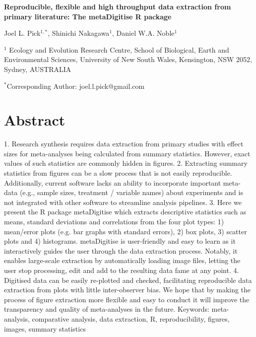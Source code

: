 \documentclass[12pt]{article}
\newcommand{\pkg}[1]{{\fontseries{b}\selectfont #1}}
\let\proglang=\textsf
\begin{document}
\newenvironment{CodeChunk}{}{}

\raggedright


\textbf{Reproducible, flexible and high throughput data extraction from primary literature: The \pkg{metaDigitise} \proglang{R} package}

Joel L. Pick$^{1,*}$, Shinichi Nakagawa$^1$, Daniel W.A. Noble$^1$

$^1$
  Ecology and Evolution Research Centre, School of Biological, Earth and Environmental Sciences,  University of New South Wales, Kensington, NSW 2052, Sydney, AUSTRALIA

 $^*$Corresponding Author: joel.l.pick@gmail.com\\




\section*{Abstract}
1. Research synthesis requires data extraction from primary studies with effect sizes for meta-analyses being calculated from summary statistics. However, exact values of such statistics are commonly hidden in figures. 
2. Extracting summary statistics from figures can be a slow process that is not easily reproducible. Additionally, current software lacks an ability to incorporate important meta-data (e.g., sample sizes, treatment / variable names) about experiments and is not integrated with other software to streamline analysis pipelines.
3. Here we present the R package \pkg{metaDigitise} which extracts descriptive statistics such as means, standard deviations and correlations from the four plot types: 1) mean/error plots (e.g. bar graphs with standard errors), 2) box plots, 3) scatter plots and 4) histograms. \pkg{metaDigitise} is user-friendly and easy to learn as it interactively guides the user through the data extraction process. Notably, it enables large-scale extraction by automatically loading image files, letting the user stop processing, edit and add to the resulting data fame at any point. 
4. Digitised data can be easily re-plotted and checked, facilitating reproducible data extraction from plots with little inter-observer bias. We hope that by making the process of figure extraction more flexible and easy to conduct it will improve the transparency and quality of meta-analyses in the future.
 Keywords: meta-analysis, comparative analysis, data extraction, \proglang{R}, reproducibility, figures, images, summary statistics
\end{document}
